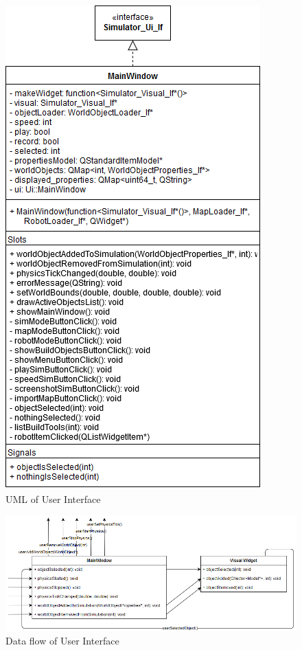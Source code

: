  \begin{figure}
 	\begin{center}
 	\includegraphics[scale=0.5]{./images_design/uml/MainWindow}
 	\caption{UML of User Interface\label{uml:mainwin}}
 	\end{center}
 \end{figure}
 
 \begin{figure}
 	\begin{center}
 	\includegraphics[scale=0.5]{./images_design/uml/DataFlow_UI}
 	\caption{Data flow of User Interface\label{uml:dataflow_ui}}
 	\end{center}
 \end{figure} 
 
